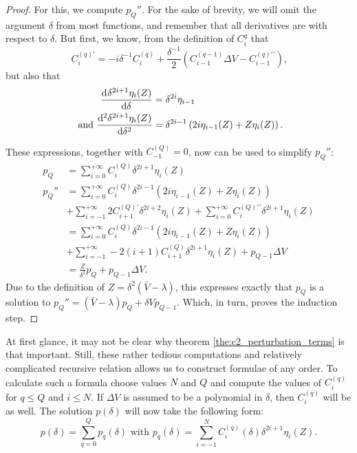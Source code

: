 \begin{proof}
For this, we compute $p_Q''$. For the sake of brevity, we will omit the argument $\delta$ from most functions, and remember that all derivatives are with respect to $\delta$. But first, we know, from the definition of $C_i^q$ that
$$
    C_i^{(q)\prime} = -i \delta^{-1} C_i^{(q)} + \frac{\delta^{-1}}{2}\left(C^{(q-1)}_{i-1}\Delta V - C^{(q)\prime\prime}_{i-1}\right)\text{,}
$$
but also that
\begin{align*}
    {\dv[]{\delta^{2i+1}\eta_i(Z)}{\delta}}               & = \delta^{2i} \eta_{i-1}                                         \\
    \text{ and } {\dv[2]{\delta^{2i+1}\eta_i(Z)}{\delta}} & = \delta^{2i-1}\left(2i\eta_{i-1}(Z) + Z\eta_i(Z)\right)\text{.}
\end{align*}

\begingroup
\allowdisplaybreaks
These expressions, together with $C_{-1}^{(Q)} = 0$, now can be used to simplify $p_Q''$:
\begin{align*}
    p_Q   & = \sum_{i=0}^{+\infty} C_{i}^{(Q)} \delta^{2i + 1} \eta_{i}(Z)                                                                            \\
    p_Q'' & = \sum_{i=0}^{+\infty} C_i^{(Q)}\delta^{2i-1}\left(2i\eta_{i-1}(Z) + Z\eta_i(Z)\right)                                                    \\
          & + \sum_{i=-1}^{+\infty} 2C_{i+1}^{(Q)\prime}\delta^{2i+2}\eta_{i}(Z) + \sum_{i=0}^{+\infty} C_i^{(Q)\prime\prime}\delta^{2i+1}\eta_{i}(Z) \\
          & = \sum_{i=0}^{+\infty} C_i^{(Q)}\delta^{2i-1}\left(2i\eta_{i-1}(Z) + Z\eta_i(Z)\right)                                                    \\
          & + \sum_{i=-1}^{+\infty} -2(i+1)C_{i+1}^{(Q)}\delta^{2i+1}\eta_{i}(Z) + p_{Q-1} \Delta V                                                   \\
          & = \frac{Z}{\delta^2}p_Q + p_{Q-1} \Delta V \text{.}
\end{align*}
\endgroup
Due to the definition of $Z = \delta^2(\bar{V} - \lambda)$, this expresses exactly that $p_Q$ is a solution to $p_Q'' = (\bar{V} - \lambda)p_Q + \delta V p_{Q-1}$. Which, in turn, proves the induction step.
\end{proof}

At first glance, it may not be clear why theorem \ref{the:c2_perturbation_terms} is that important. Still, these rather tedious computations and relatively complicated recursive relation allows us to construct formulae of any order. To calculate such a formula choose values $N$ and $Q$ and compute the values of $C_{i}^{(q)}$ for $q \leq Q$ and $i \leq N$. If $\Delta V$ is assumed to be a polynomial in $\delta$, then $C_{i}^{(q)}$ will be as well. The solution $p(\delta)$ will now take the following form:
$$
    p(\delta) = \sum_{q=0}^{Q} p_q(\delta) \text{ with } p_q(\delta) = \sum_{i=-1}^{N} C_{i}^{(q)}(\delta) \delta^{2i+1} \eta_i(Z) \text{.}
$$

